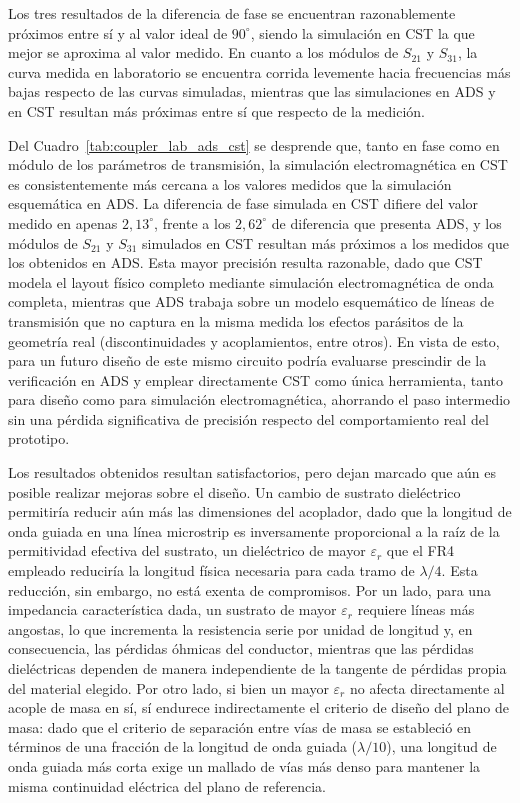 Los tres resultados de la diferencia de fase se encuentran razonablemente próximos entre sí y al valor ideal de $90^\circ$, siendo la simulación en CST la que mejor se aproxima al valor medido. En cuanto a los módulos de $S_{21}$ y $S_{31}$, la curva medida en laboratorio se encuentra corrida levemente hacia frecuencias más bajas respecto de las curvas simuladas, mientras que las simulaciones en ADS y en CST resultan más próximas entre sí que respecto de la medición.

Del Cuadro~\ref{tab:coupler_lab_ads_cst} se desprende que, tanto en fase como en módulo de los parámetros de transmisión, la simulación electromagnética en CST es consistentemente más cercana a los valores medidos que la simulación esquemática en ADS. La diferencia de fase simulada en CST difiere del valor medido en apenas $2,13^\circ$, frente a los $2,62^\circ$ de diferencia que presenta ADS, y los módulos de $S_{21}$ y $S_{31}$ simulados en CST resultan más próximos a los medidos que los obtenidos en ADS. Esta mayor precisión resulta razonable, dado que CST modela el layout físico completo mediante simulación electromagnética de onda completa, mientras que ADS trabaja sobre un modelo esquemático de líneas de transmisión que no captura en la misma medida los efectos parásitos de la geometría real (discontinuidades y acoplamientos, entre otros). En vista de esto, para un futuro diseño de este mismo circuito podría evaluarse prescindir de la verificación en ADS y emplear directamente CST como única herramienta, tanto para diseño como para simulación electromagnética, ahorrando el paso intermedio sin una pérdida significativa de precisión respecto del comportamiento real del prototipo.
 
Los resultados obtenidos resultan satisfactorios, pero dejan marcado que aún es posible realizar mejoras sobre el diseño. Un cambio de sustrato dieléctrico permitiría reducir aún más las dimensiones del acoplador, dado que la longitud de onda guiada en una línea microstrip es inversamente proporcional a la raíz de la permitividad efectiva del sustrato, un dieléctrico de mayor $\varepsilon_r$ que el FR4 empleado reduciría la longitud física necesaria para cada tramo de $\lambda/4$. Esta reducción, sin embargo, no está exenta de compromisos. Por un lado, para una impedancia característica dada, un sustrato de mayor $\varepsilon_r$ requiere líneas más angostas, lo que incrementa la resistencia serie por unidad de longitud y, en consecuencia, las pérdidas óhmicas del conductor, mientras que las pérdidas dieléctricas dependen de manera independiente de la tangente de pérdidas propia del material elegido. Por otro lado, si bien un mayor $\varepsilon_r$ no afecta directamente al acople de masa en sí, sí endurece indirectamente el criterio de diseño del plano de masa: dado que el criterio de separación entre vías de masa se estableció en términos de una fracción de la longitud de onda guiada ($\lambda/10$), una longitud de onda guiada más corta exige un mallado de vías más denso para mantener la misma continuidad eléctrica del plano de referencia.
 
